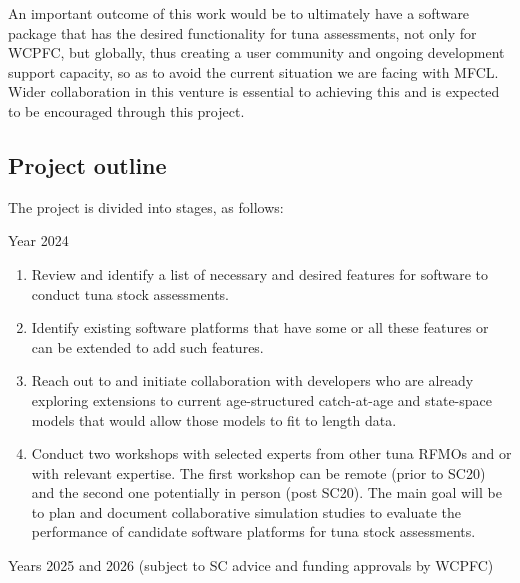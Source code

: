 \documentclass{SCreport}
\begin{document}
An important outcome of this work would be to ultimately have a software package
that has the desired functionality for tuna assessments, not only for WCPFC, but
globally, thus creating a user community and ongoing development support
capacity, so as to avoid the current situation we are facing with MFCL. Wider
collaboration in this venture is essential to achieving this and is expected to
be encouraged through this project.

\subsection{Project outline}

The project is divided into stages, as follows:

Year 2024

\begin{enumerate}
  \item Review and identify a list of necessary and desired features for
  software to conduct tuna stock assessments.
  \item Identify existing software platforms that have some or all these
  features or can be extended to add such features.
  \item Reach out to and initiate collaboration with developers who are already
  exploring extensions to current age-structured catch-at-age and state-space
  models that would allow those models to fit to length data.
  \item Conduct two workshops with selected experts from other tuna RFMOs and or
  with relevant expertise. The first workshop can be remote (prior to SC20) and
  the second one potentially in person (post SC20). The main goal will be to
  plan and document collaborative simulation studies to evaluate the performance
  of candidate software platforms for tuna stock assessments.
\end{enumerate}

Years 2025 and 2026 (subject to SC advice and funding approvals by WCPFC)
\end{document}
